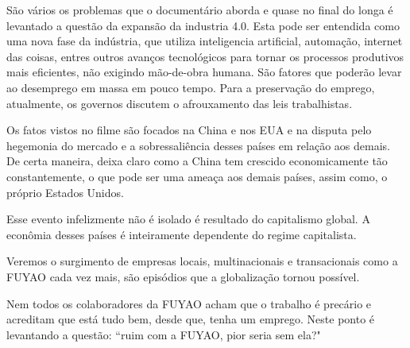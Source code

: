 \documentclass[12pt,a4paper,oneside]{article}
\begin{document}
\begin{onehalfspace}
São vários os problemas que o documentário aborda e quase no final do longa é levantado a questão da expansão da industria 4.0. Esta pode ser entendida como uma nova fase da indústria, que utiliza inteligencia artificial, automação, internet das coisas, entres outros avanços tecnológicos para tornar os processos produtivos mais eficientes, não exigindo mão-de-obra humana. São fatores que poderão levar ao desemprego em massa em pouco tempo. Para a preservação do emprego, atualmente, os governos discutem o afrouxamento das leis trabalhistas. 

Os fatos vistos no filme são focados na China e nos EUA e na disputa pelo hegemonia do mercado e a sobressaliência desses países em relação aos demais. De certa maneira, deixa claro como a China tem crescido economicamente tão constantemente, o que pode ser uma ameaça aos demais países, assim como, o próprio Estados Unidos. 


Esse evento infelizmente não é isolado é resultado do capitalismo global. A econômia desses países é inteiramente dependente do regime capitalista.

Veremos o surgimento de empresas locais, multinacionais e transacionais como a FUYAO cada vez mais, são episódios que a globalização tornou possível.

Nem todos os colaboradores da FUYAO acham que o trabalho é precário e acreditam que está tudo bem, desde que, tenha um emprego. Neste ponto é levantando a questão: ``ruim com a FUYAO, pior seria sem ela?"

\end{onehalfspace}
\end{document}
